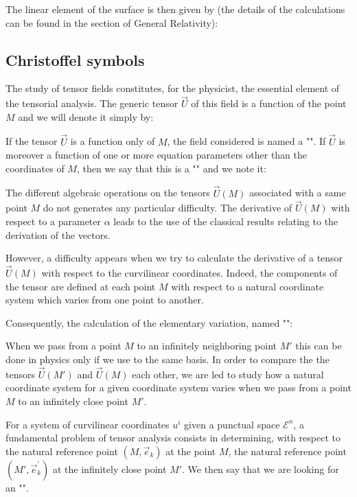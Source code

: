 	The linear element of the surface is then given by (the details of the calculations can be found in the section of General Relativity):
	
	
	\pagebreak
	\subsection{Christoffel symbols}
	The study of tensor fields constitutes, for the physicist, the essential element of the tensorial analysis. The generic tensor $\vec{U}$ of this field is a function of the point $M$ and we will denote it simply by:
	
If the tensor $\vec{U}$ is a function only of $M$, the field considered is named a "". If $\vec{U}$ is moreover a function of one or more equation parameters other than the coordinates of $M$, then we say that this is a "" and we note it:
	
	The different algebraic operations on the tensors $\vec{U}(M)$ associated with a same point $M$ do not generates any particular difficulty. The derivative of $\vec{U}(M)$ with respect to a parameter $\alpha$ leads to the use of the classical results relating to the derivation of the vectors.
	
	However, a difficulty appears when we try to calculate the derivative of a tensor $\vec{U}(M)$ with respect to the curvilinear coordinates. Indeed, the components of the tensor are defined at each point $M$ with respect to a natural coordinate system which varies from one point to another.

	Consequently, the calculation of the elementary variation, named "":
	
	When we pass from a point $M$ to an infinitely neighboring point $M'$ this can be done in physics only if we use to the same basis. In order to compare the the tensors $\vec{U}(M')$ and $\vec{U}(M)$ each other, we are led to study how a natural coordinate system for a given coordinate system varies when we pass from a point $M$ to an infinitely close point $M'$.
	
	For a system of curvilinear coordinates $u^i$ given a punctual space $\mathcal{E}^n$, a fundamental problem of tensor analysis consists in determining, with respect to the natural reference point $(M,\vec{e}_k)$ at the point $M$, the natural reference point $(M',\vec{e}_k^{'})$ at the infinitely close point $M'$. We then say that we are looking for an "".
	
